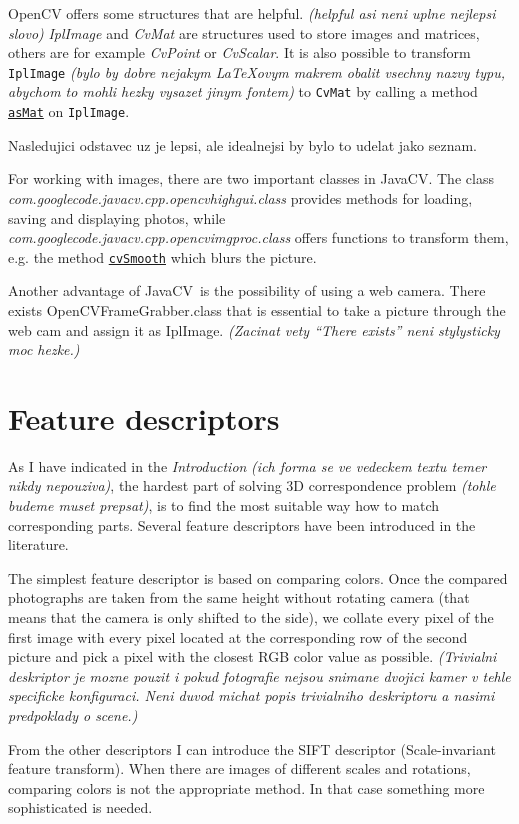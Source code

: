 \documentclass[12pt]{article}
\newcommand{\lm}[1]{\textcolor{OliveGreen}{\begin{framed}#1\end{framed}}}
\newcommand{\lmv}[1]{\textit{\textcolor{OliveGreen}{(#1)}}}
\newcommand{\stype}[1]{\texttt{#1}}
\newcommand{\sfunc}[1]{\underline{\texttt{#1}}}
\def\jcv{JavaCV}
\begin{document}
	 OpenCV offers some structures that are helpful. \lmv{helpful asi neni uplne nejlepsi slovo} {\itshape IplImage} and {\itshape CvMat} are structures used to store images and matrices, others are for example {\itshape CvPoint} or {\itshape CvScalar}. 
	 It is also possible to transform \stype{IplImage} \lmv{bylo by dobre nejakym \LaTeX ovym makrem obalit vsechny nazvy typu, abychom to mohli hezky vysazet jinym fontem} to \stype{CvMat} by calling a method \sfunc{asMat} on \stype{IplImage}.
	 \lm{Nasledujici odstavec uz je lepsi, ale idealnejsi by bylo to udelat jako seznam.} 
	 For working with images, there are two important classes in JavaCV. The class {\itshape com.googlecode.javacv.cpp.opencv\textunderscore highgui.class} provides methods for loading, saving and displaying photos, while {\itshape com.googlecode.javacv.cpp.opencv\textunderscore imgproc.class} offers functions to transform them, e.g. the method \sfunc{cvSmooth} which blurs the picture.
	 
	 Another advantage of \jcv\ is the possibility of using a web camera. There exists OpenCVFrameGrabber.class that is essential to take a picture through the web cam and assign it as IplImage. \lmv{Zacinat vety ``There exists'' neni stylysticky moc hezke.} 
	
	\section{Feature descriptors}
	As I have indicated in the {\itshape Introduction} \lmv{ich forma se ve vedeckem textu temer nikdy nepouziva}, the hardest part of solving 3D correspondence problem \lmv{tohle budeme muset prepsat}, is to find the most suitable way how to match corresponding parts. 
	Several feature descriptors have been introduced in the literature. 
	
	The simplest feature descriptor is based on comparing colors. Once the compared photographs are taken from the same height without rotating camera (that means that the camera is only shifted to the side), we collate every pixel of the first image with every pixel located at the corresponding row of the second picture and pick a pixel with the closest RGB color value as possible. \lmv{Trivialni deskriptor je mozne pouzit i pokud fotografie nejsou snimane dvojici kamer v tehle specificke konfiguraci. Neni duvod michat popis trivialniho deskriptoru a nasimi predpoklady o scene.}
	
	From the other descriptors I can introduce the SIFT descriptor (Scale-invariant feature transform). When there are images of different scales and rotations, comparing colors is not the appropriate method. In that case something more sophisticated is needed. 
	
\end{document}

